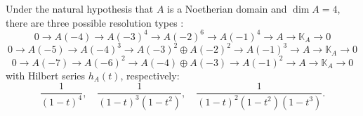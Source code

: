 \documentclass{amsart}
\begin{document}


Under the natural hypothesis that $A$ is a Noetherian domain and $
\dim A = 4$, there are three possible resolution types \cite[Prop.~1.4]{Lu_2007}:
\begin{equation}\label{eq:type3}
    0 \rightarrow A(-4) \rightarrow A(-3)^4 \rightarrow A(-2)^6 \rightarrow A(-1)^4 \rightarrow A \rightarrow \mathbb{K}_A \rightarrow 0
\end{equation}
\begin{equation}
    0 \rightarrow A(-5) \rightarrow A(-4)^3 \rightarrow A(-3)^2 \oplus A(-2)^2 \rightarrow A(-1)^3 \rightarrow A \rightarrow \mathbb{K}_A\rightarrow 0
\end{equation}
\begin{equation} 
    0 \rightarrow A(-7) \rightarrow A(-6)^2 \rightarrow A(-4) \oplus A(-3) \rightarrow A(-1)^2 \rightarrow A \rightarrow \mathbb{K}_A\rightarrow 0
\end{equation}
with Hilbert series $h_A(t)$, respectively:
$$ \frac{1}{(1-t)^4}, \quad \frac{1}{(1-t)^3(1-t^2)}, \quad \frac{1}{(1-t)^2(1-t^2)(1-t^3)}.$$
\end{document}
